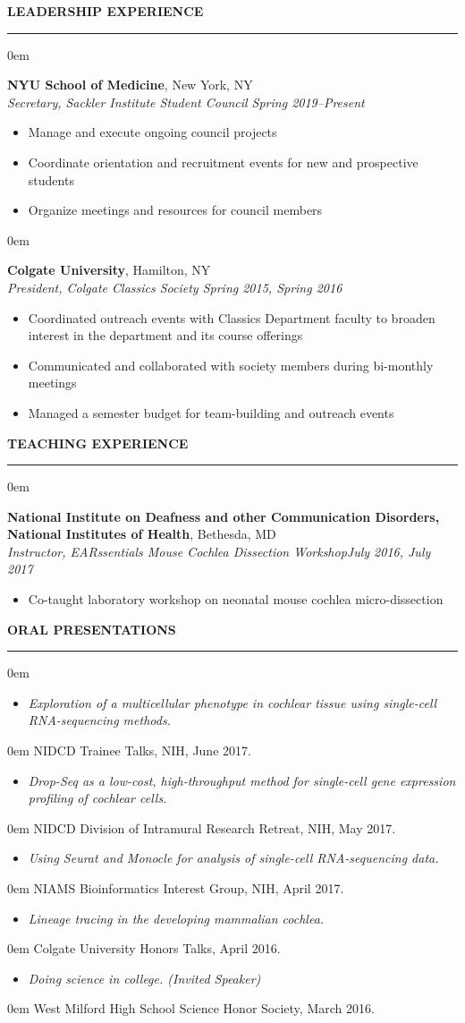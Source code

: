 \documentclass[11pt, letterpaper]{article}
\newenvironment{CVSection}{
\begin{addmargin}[2em]{0em}
\begin{samepage}}
{\end{samepage}
\end{addmargin}\bigskip}
\newcommand{\CVList}[2]{
\begin{samepage}
\begin{itemize}[leftmargin=*]
\item \textsl{#1}
\end{itemize}
\begin{addmargin}[2.5em]{0em}
#2
\end{addmargin}
\end{samepage}
}
\newcommand{\CVHeading}[1]{
\MakeUppercase{\bf #1}
\smallskip
\hrule
\medskip
}
\begin{document}
\CVHeading{Leadership Experience}
\begin{CVSection}
\textbf{NYU School of Medicine}, New York, NY\\
\textsl{Secretary, Sackler Institute Student Council	\hfill Spring 2019--Present}
\begin{itemize}
\item Manage and execute ongoing council projects
\item Coordinate orientation and recruitment events for new and prospective students
\item Organize meetings and resources for council members
\end{itemize}
\end{CVSection}
\begin{CVSection}
\textbf{Colgate University}, Hamilton, NY\\
\textsl{President, Colgate Classics Society	\hfill Spring 2015, Spring 2016}
\begin{itemize}
\item Coordinated outreach events with Classics Department faculty to broaden interest in the department and its course offerings
\item Communicated and collaborated with society members during bi-monthly meetings
\item Managed a semester budget for team-building and outreach events
\end{itemize}
\end{CVSection}

\CVHeading{Teaching Experience}
\begin{CVSection}
\textbf{National Institute on Deafness and other Communication Disorders,\\ National Institutes of Health}, Bethesda, MD\\
\textsl{Instructor, EARssentials Mouse Cochlea Dissection Workshop\hfill July 2016, July 2017}
\begin{itemize}
\item Co-taught laboratory workshop on neonatal mouse cochlea micro-dissection
\end{itemize}
\end{CVSection}

\CVHeading{Oral Presentations}
\begin{CVSection}
\CVList{Exploration of a multicellular phenotype in cochlear tissue using single-cell RNA-sequencing methods.}{NIDCD Trainee Talks, NIH, June 2017.}
\CVList{Drop-Seq as a low-cost, high-throughput method for single-cell gene expression profiling of cochlear cells.}{NIDCD Division of Intramural Research Retreat, NIH, May 2017.}
\CVList{Using Seurat and Monocle for analysis of single-cell RNA-sequencing data.}{NIAMS Bioinformatics Interest Group, NIH, April 2017.}
\CVList{Lineage tracing in the developing mammalian cochlea.}{Colgate University Honors Talks, April 2016.}
\CVList{Doing science in college. \textnormal{(Invited Speaker)}}{West Milford High School Science Honor Society, March 2016.}
\end{CVSection}
\end{document}
